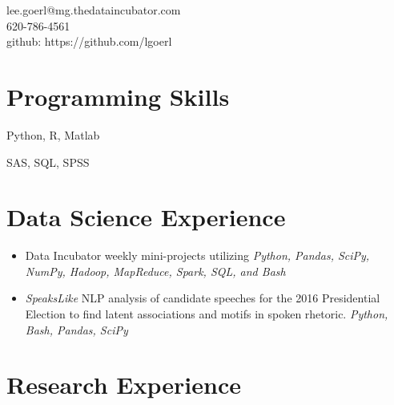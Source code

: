 \documentclass[a4paper,10pt,notitlepage]{article}
\begin{document}
\begin{multicols}{2}{
\noindent %

\noindent lee.goerl@mg.thedataincubator.com\\
620-786-4561\\
github: https://github.com/lgoerl
}
\end{multicols}
\vspace{-10pt}\section*{Programming Skills}
	\begin{description}
	\vspace{-5pt} \item[Experienced:] Python, R, Matlab
	\item[Basic:] SAS, SQL, SPSS
	\end{description}

\section*{Data Science Experience}

	\begin{itemize}
		\vspace{-5pt}\item Data Incubator weekly mini-projects utilizing \emph{Python, Pandas, SciPy, NumPy, Hadoop, MapReduce, Spark, SQL, and Bash}
		\vspace{-5pt}\item \emph{SpeaksLike} NLP analysis of candidate speeches for the 2016 Presidential Election to find latent associations and motifs in spoken rhetoric. \emph{Python, Bash, Pandas, SciPy}
	\end{itemize}


\section*{Research Experience}
\end{document}
